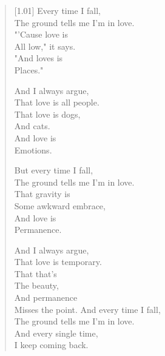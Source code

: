 \begin{verse}[1.01\textwidth]
Every time I fall,\\
\vin The ground tells me I'm in love.\\
"'Cause love is\\
\vin All low," it says.\\
"And loves is\\
\vin Places."

And I always argue,\\
\vin That love is all people.\\
That love is dogs,\\
\vin And cats.\\
And love is\\
\vin Emotions.

But every time I fall,\\
\vin The ground tells me I'm in love.\\
That gravity is\\
\vin Some awkward embrace,\\
And love is\\
\vin Permanence.

\newpage

\null
\vspace{1cm}

And I always argue,\\
\vin That love is temporary.\\
That that's\\
\vin The beauty,\\
And permanence\\
\vin Misses the point.
And every time I fall,\\
\vin The ground tells me I'm in love.\\
And every single time,\\
\vin I keep coming back.
\end{verse}
